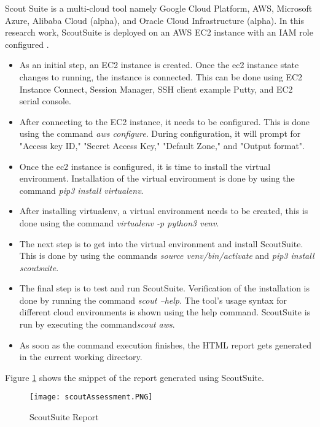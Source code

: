 \par Scout Suite is a multi-cloud tool namely Google Cloud Platform, AWS, Microsoft Azure, Alibaba Cloud (alpha), and
Oracle Cloud Infrastructure (alpha). In this research work, ScoutSuite is deployed on an AWS EC2 instance with an
IAM role configured \cite{73}.

\begin{itemize}
    \item As an initial step, an EC2 instance is created. Once the ec2 instance state changes to running, the instance is connected. This can be done using EC2 Instance Connect, Session Manager, SSH client example Putty, and EC2 serial console.
\end{itemize}

\begin{itemize}
    \item After connecting to the EC2 instance, it needs to be configured. This is done using the command \textit{aws configure}. During configuration, it will prompt for "Access key ID," "Secret Access Key," "Default Zone," and "Output format".
\end{itemize}

\begin{itemize}
    \item Once the ec2 instance is configured, it is time to install the virtual environment. Installation of the
    virtual environment is done by using the command \textit{pip3 install virtualenv}.
\end{itemize}
\begin{itemize}
    \item After installing virtualenv, a virtual environment needs to be created, this is done using the command
    \textit{virtualenv -p python3 venv}.
\end{itemize}
\begin{itemize}
    \item The next step is to get into the virtual environment and install ScoutSuite. This is done by using the
    commands \textit{source venv/bin/activate} and \textit{pip3 install scoutsuite}.
\end{itemize}
\begin{itemize}
    \item The final step is to test and run ScoutSuite. Verification of the installation is done by running the
    command \textit{scout --help}. The tool's usage syntax for different cloud environments is shown using the help
    command. ScoutSuite is run by executing the command\textit{scout aws}.
\end{itemize}
\begin{itemize}
    \item As soon as the command execution finishes, the HTML report gets generated in the current working directory.
\end{itemize}

Figure \ref{fig:deployscoutsuite} shows the snippet of the report generated using ScoutSuite.

\begin{figure}
    \centering
    \texttt{[image: scoutAssessment.PNG]}
    \caption{ScoutSuite Report}
    \label{fig:deployscoutsuite}
\end{figure}